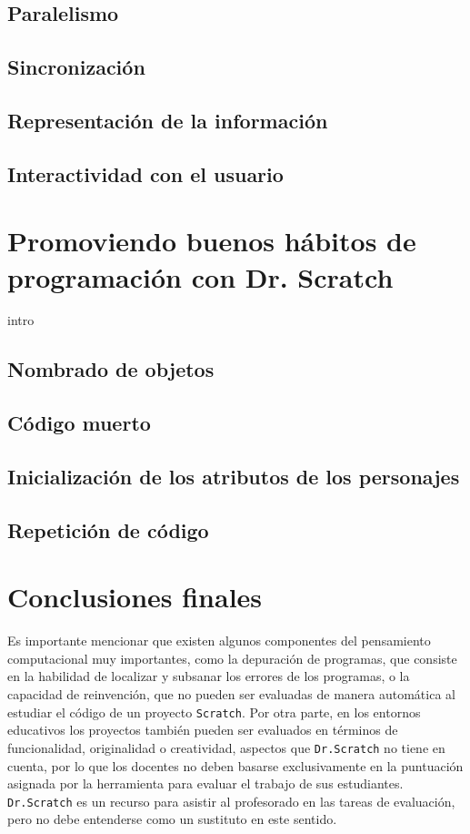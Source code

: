 \documentclass[a4paper,10pt]{article}
\begin{document}
\subsection{Paralelismo}
\subsection{Sincronización}
\subsection{Representación de la información}
\subsection{Interactividad con el usuario}

\section{Promoviendo buenos hábitos de programación con Dr. Scratch}
intro
\subsection{Nombrado de objetos}
\subsection{Código muerto}
\subsection{Inicialización de los atributos de los personajes}
\subsection{Repetición de código}

\section{Conclusiones finales}
Es importante mencionar que existen algunos componentes del pensamiento computacional muy importantes, como la depuración de programas, que consiste en la habilidad de localizar y subsanar los errores de los programas, o la capacidad de reinvención, que no pueden ser evaluadas de manera automática al estudiar el código de un proyecto \texttt{Scratch}. Por otra parte, en los entornos educativos los proyectos también pueden ser evaluados en términos de funcionalidad, originalidad o creatividad, aspectos que \texttt{Dr.Scratch} no tiene en cuenta, por lo que los docentes no deben basarse exclusivamente en la puntuación asignada por la herramienta para evaluar el trabajo de sus estudiantes. \texttt{Dr.Scratch} es un recurso para asistir al profesorado en las tareas de evaluación, pero no debe entenderse como un sustituto en este sentido.
\end{document}

